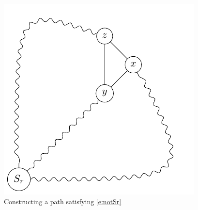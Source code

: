 \documentclass[a4paper]{article}
\theoremstyle{definition}
\begin{document}
\begin{figure}[h!]
\centering
\includegraphics[]{img/algo/E1}
\caption{Constructing a path satisfying \ref{e:notSr} \label{fig:E1}}
\end{figure}
\end{document}
